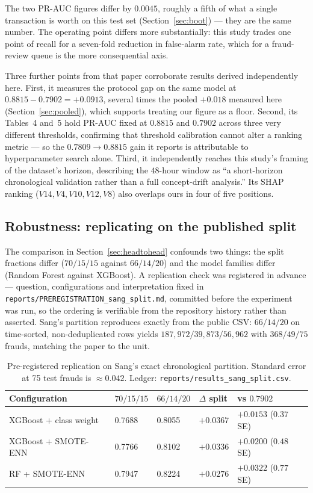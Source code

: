 \documentclass[11pt,a4paper]{article}
\newcommand{\code}[1]{\texttt{\small #1}}
\begin{document}
The two PR-AUC figures differ by $0.0045$, roughly a fifth of what a single transaction is worth
on this test set (Section~\ref{sec:boot}) --- they are the same number. The operating point
differs more substantially: this study trades one point of recall for a seven-fold reduction in
false-alarm rate, which for a fraud-review queue is the more consequential axis.

Three further points from that paper corroborate results derived independently here. First, it
measures the protocol gap on the same model at $0.8815 - 0.7902 = +0.0913$, several times the
pooled $+0.018$ measured here (Section~\ref{sec:pooled}), which supports treating our figure as
a floor. Second, its Tables~4 and~5 hold PR-AUC fixed at $0.8815$ and $0.7902$ across three very
different thresholds, confirming that threshold calibration cannot alter a ranking metric --- so
the $0.7809 \to 0.8815$ gain it reports is attributable to hyperparameter search alone. Third,
it independently reaches this study's framing of the dataset's horizon, describing the
$48$-hour window as ``a short-horizon chronological validation rather than a full concept-drift
analysis.'' Its SHAP ranking ($V14, V4, V10, V12, V8$) also overlaps ours in four of five
positions.

\subsection{Robustness: replicating on the published split}\label{sec:sangrep}
The comparison in Section~\ref{sec:headtohead} confounds two things: the split fractions differ
($70/15/15$ against $66/14/20$) and the model families differ (Random Forest against XGBoost).
A replication check was registered in advance --- question, configurations and interpretation
fixed in \code{reports/PREREGISTRATION\_sang\_split.md}, committed before the experiment was
run, so the ordering is verifiable from the repository history rather than asserted. Sang's
partition reproduces exactly from the public CSV: $66/14/20$ on time-sorted, non-deduplicated
rows yields $187{,}972 / 39{,}873 / 56{,}962$ with $368 / 49 / 75$ frauds, matching the paper
to the unit.

\begin{table}[h]
      \centering\small
      \caption{Pre-registered replication on Sang's exact chronological partition. Standard
      error at 75 test frauds is $\approx0.042$. Ledger:
      \code{reports/results\_sang\_split.csv}.}
      \label{tab:sangrep}
      \begin{tabularx}{\textwidth}{Xllll}
            \toprule
            Configuration & $70/15/15$ & $66/14/20$ & $\Delta$ split & vs $0.7902$\\
            \midrule
            XGBoost + class weight & 0.7688 & 0.8055 & $+0.0367$ & $+0.0153$ ($0.37$ SE)\\
            XGBoost + SMOTE-ENN & 0.7766 & 0.8102 & $+0.0336$ & $+0.0200$ ($0.48$ SE)\\
            RF + SMOTE-ENN & 0.7947 & 0.8224 & $+0.0276$ & $+0.0322$ ($0.77$ SE)\\
            \bottomrule
      \end{tabularx}
\end{table}
\end{document}
